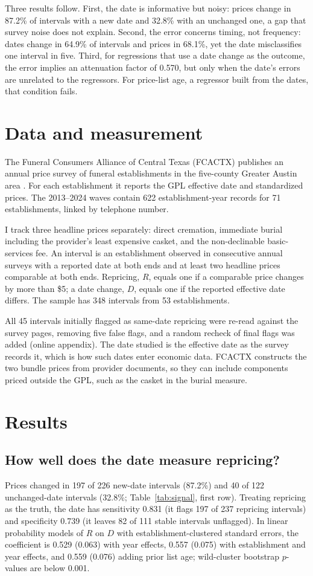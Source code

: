 \documentclass[preprint,12pt,authoryear]{elsarticle}
\begin{document}
Three results follow. First, the date is informative but noisy: prices change in 87.2\% of intervals with a new date and 32.8\% with an unchanged one, a gap that survey noise does not explain. Second, the error concerns timing, not frequency: dates change in 64.9\% of intervals and prices in 68.1\%, yet the date misclassifies one interval in five. Third, for regressions that use a date change as the outcome, the error implies an attenuation factor of 0.570, but only when the date's errors are unrelated to the regressors. For price-list age, a regressor built from the dates, that condition fails.

\section{Data and measurement}
The Funeral Consumers Alliance of Central Texas (FCACTX) publishes an annual price survey of funeral establishments in the five-county Greater Austin area \citep{fcactx_cost_comparisons}. For each establishment it reports the GPL effective date and standardized prices. The 2013--2024 waves contain 622 establishment-year records for 71 establishments, linked by telephone number.

I track three headline prices separately: direct cremation, immediate burial including the provider's least expensive casket, and the non-declinable basic-services fee. An interval is an establishment observed in consecutive annual surveys with a reported date at both ends and at least two headline prices comparable at both ends. Repricing, $R$, equals one if a comparable price changes by more than \$5; a date change, $D$, equals one if the reported effective date differs. The sample has 348 intervals from 53 establishments.

All 45 intervals initially flagged as same-date repricing were re-read against the survey pages, removing five false flags, and a random recheck of final flags was added (online appendix). The date studied is the effective date as the survey records it, which is how such dates enter economic data. FCACTX constructs the two bundle prices from provider documents, so they can include components priced outside the GPL, such as the casket in the burial measure.

\section{Results}
\subsection{How well does the date measure repricing?}
Prices changed in 197 of 226 new-date intervals (87.2\%) and 40 of 122 unchanged-date intervals (32.8\%; Table~\ref{tab:signal}, first row). Treating repricing as the truth, the date has sensitivity 0.831 (it flags 197 of 237 repricing intervals) and specificity 0.739 (it leaves 82 of 111 stable intervals unflagged). In linear probability models of $R$ on $D$ with establishment-clustered standard errors, the coefficient is 0.529 (0.063) with year effects, 0.557 (0.075) with establishment and year effects, and 0.559 (0.076) adding prior list age; wild-cluster bootstrap $p$-values are below 0.001.
\end{document}

